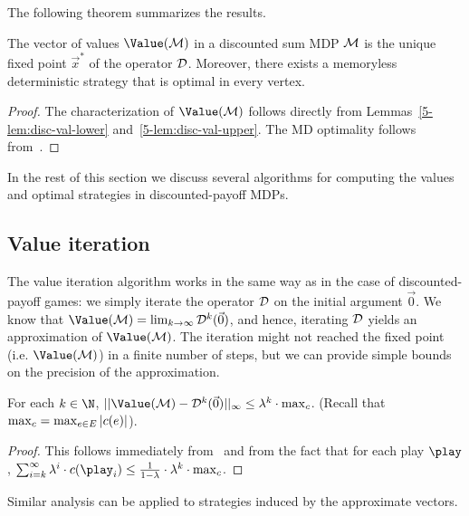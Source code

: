 The following theorem summarizes the results.

\begin{theorem}
\label{5-thm:disc-val-char-mem}
The vector of values $\Value(\mdp)$ in a discounted sum MDP $\mathcal{M}$ is the 
unique fixed point $\vec{x}^*$ of the operator $\mathcal{D}$. Moreover, there 
exists a 
memoryless deterministic strategy that is optimal in every vertex.
\end{theorem}
\begin{proof}
The characterization of $\Value(\mdp)$ follows directly from 
Lemmas~\ref{5-lem:disc-val-lower} and~\ref{5-lem:disc-val-upper}. The MD 
optimality follows from~.
\end{proof}

In the rest of this section we discuss several algorithms for computing the 
values and optimal strategies in discounted-payoff MDPs.

\subsection*{Value iteration}

The value iteration algorithm works in the same way as in the case of 
discounted-payoff games: we simply iterate the operator $\mathcal{D}$ on the 
initial argument $\vec{0}$. We know that $\Value(\mdp)=\lim_{k\rightarrow 
\infty}\discOP^k(\vec{0})$, and hence, iterating $\mathcal{D}$ yields an 
approximation of $\Value(\mdp)$. The iteration might not reached the fixed 
point (i.e. $\Value(\mdp)$) in a finite number of steps, but we can provide 
simple bounds on the precision of the approximation.

\begin{lemma}
\label{5-lem:disc-val-it-convergence}
For each $k\in \N$, $||\Value(\mdp)-\discOP^k(\vec{0}) ||_{\infty} \leq 
\lambda^k \cdot \maxc$. (Recall that $\max_{c}=\max_{e\in 
E}|c(e)|$).	
\end{lemma}
\begin{proof}
This follows immediately from~ and from the fact that 
for each play $\play$, $\sum_{i=k}^{\infty}\lambda^i\cdot 
\colouring(\play_i)\leq \frac{1}{1-\lambda}\cdot\lambda^k \cdot \maxc$.
\end{proof}

Similar analysis can be applied to strategies induced by the approximate 
vectors.

